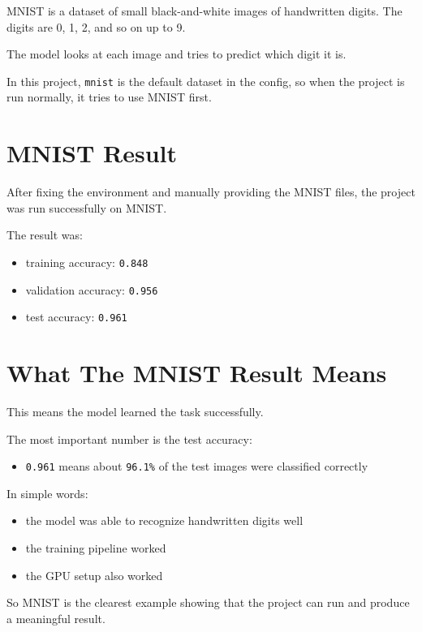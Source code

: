 \documentclass[12pt]{article}
\begin{document}
MNIST is a dataset of small black-and-white images of handwritten digits. The digits are 0, 1, 2, and so on up to 9.

The model looks at each image and tries to predict which digit it is.

In this project, \texttt{mnist} is the default dataset in the config, so when the project is run normally, it tries to use MNIST first.

\section*{MNIST Result}

After fixing the environment and manually providing the MNIST files, the project was run successfully on MNIST.

The result was:

\begin{itemize}
    \item training accuracy: \texttt{0.848}
    \item validation accuracy: \texttt{0.956}
    \item test accuracy: \texttt{0.961}
\end{itemize}

\section*{What The MNIST Result Means}

This means the model learned the task successfully.

The most important number is the test accuracy:

\begin{itemize}
    \item \texttt{0.961} means about \texttt{96.1\%} of the test images were classified correctly
\end{itemize}

In simple words:

\begin{itemize}
    \item the model was able to recognize handwritten digits well
    \item the training pipeline worked
    \item the GPU setup also worked
\end{itemize}

So MNIST is the clearest example showing that the project can run and produce a meaningful result.
\end{document}
